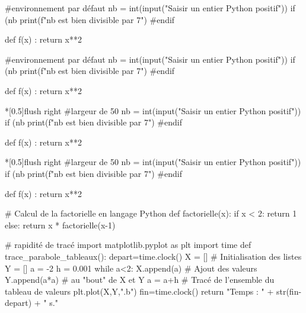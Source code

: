 \documentclass{article}
\begin{document}
\begin{codetex}
\begin{envcodepython}{} %
#environnement par défaut
nb = int(input("Saisir un entier Python positif"))
if (nb %
	print(f"{nb} est bien divisible par 7")
#endif

def f(x) :
	return x**2
\end{envcodepython}
\end{codetex}

\begin{codesortie}
\begin{envcodepython}{}
#environnement par défaut
nb = int(input("Saisir un entier Python positif"))
if (nb %
	print(f"{nb} est bien divisible par 7")
#endif

def f(x) :
	return x**2
\end{envcodepython}
\end{codesortie}

\begin{codetex}
\begin{envcodepython}*[0.5\linewidth]{flush right}
#largeur de 50%
nb = int(input("Saisir un entier Python positif"))
if (nb %
	print(f"{nb} est bien divisible par 7")
#endif

def f(x) :
	return x**2
\end{envcodepython}
\end{codetex}

\begin{codesortie}
\begin{envcodepython}*[0.5\linewidth]{flush right}
#largeur de 50%
nb = int(input("Saisir un entier Python positif"))
if (nb %
	print(f"{nb} est bien divisible par 7")
#endif

def f(x) :
	return x**2
\end{envcodepython}
\end{codesortie}

\begin{codetex}
\begin{scontents}[overwrite,write-out=testscript.py]
# Calcul de la factorielle en langage Python
def factorielle(x):
	if x < 2:
		return 1
	else:
		return x * factorielle(x-1)

# rapidité de tracé
import matplotlib.pyplot as plt
import time
def trace_parabole_tableaux():
	depart=time.clock()
	X = [] # Initialisation des listes
	Y = []
	a = -2
	h = 0.001
	while a<2:
		X.append(a) # Ajout des valeurs
		Y.append(a*a) # au "bout" de X et Y
		a = a+h
	# Tracé de l'ensemble du tableau de valeurs
	plt.plot(X,Y,".b")
	fin=time.clock()
	return "Temps : " + str(fin-depart) + " s."
\end{scontents}

\end{codetex}
\end{document}
